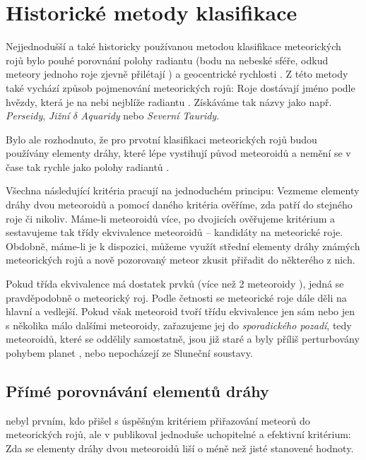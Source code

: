 \chapter{Historické metody klasifikace}%
Nejjednodušší a také historicky používanou metodou klasifikace meteorických rojů bylo pouhé porovnání polohy radiantu (bodu na nebeské sféře, odkud meteory jednoho roje zjevně přilétají \cite{glossary}) a geocentrické rychlosti \cite{radiosurvey}. Z této metody také vychází způsob pojmenování meteorických rojů: Roje dostávají jméno podle hvězdy, která je na nebi nejblíže radiantu \cite{dsh}. Získáváme tak názvy jako např. \textit{Perseidy}, \textit{Jižní $\delta$ Aquaridy} nebo \textit{Severní Tauridy}.

Bylo ale rozhodnuto, že pro prvotní klasifikaci meteorických rojů budou používány elementy dráhy, které lépe vystihují původ meteoroidů a nemění se v čase tak rychle jako polohy radiantů \cite{radiosurvey}.

\medskip

Všechna následující kritéria pracují na jednoduchém principu: Vezmeme elementy dráhy dvou meteoroidů a pomocí daného kritéria ověříme, zda patří do stejného roje či nikoliv. Máme-li meteoroidů více, po dvojicích ověřujeme kritérium a sestavujeme tak třídy ekvivalence meteoroidů -- kandidáty na meteorické roje. Obdobně, máme-li je k dispozici, můžeme využít střední elementy dráhy známých meteorických rojů a nově pozorovaný meteor zkusit přiřadit do některého z nich.

Pokud třída ekvivalence má dostatek prvků (více než 2 meteoroidy \cite{radiosurvey}), jedná se pravděpodobně o meteorický roj. Podle četnosti se meteorické roje dále děli na hlavní a vedlejší. Pokud však meteoroid tvoří třídu ekvivalence jen sám nebo jen s několika málo dalšími meteoroidy, zařazujeme jej do \textit{sporadického pozadí}, tedy meteoroidů, které se oddělily samostatně, jsou již staré a byly příliš perturbovány pohybem planet \cite{dsh}, nebo nepocházejí ze Sluneční soustavy.

\section{Přímé porovnávání elementů dráhy}%
\citeauthor{radiosurvey} nebyl prvním, kdo přišel s úspěšným kritériem přiřazování meteorů do meteorických rojů, ale v \cite{radiosurvey} publikoval jednoduše uchopitelné a efektivní kritérium: Zda se elementy dráhy dvou meteoroidů liší o méně než jisté stanovené hodnoty.


